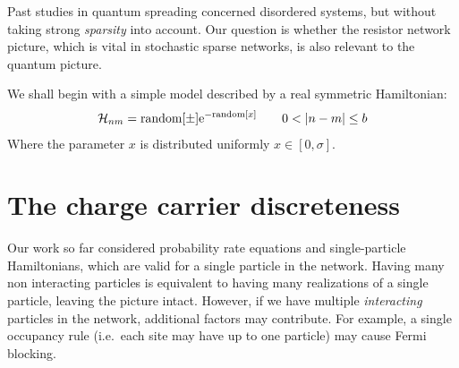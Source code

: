 Past studies in quantum spreading
\cite{cohen_wave_2000,izrailev_evolution_1997,venegas-andraca_quantum_2012,guarneri_spectral_1989,*guarneri_estimate_1993} concerned disordered systems, but
without taking strong \emph{sparsity} into account.
Our question is whether the resistor network picture,
which is vital in stochastic sparse networks, is also relevant to the quantum picture.


We shall begin with a simple model described by a real symmetric Hamiltonian:
%
\begin{align}
  \mathcal{H}_{nm} = \textrm{random}[\pm] \eexp{-\textrm{random}[x]} \qquad 0<|n-m|\le b
\end{align}
%
Where the parameter $x$ is distributed uniformly $x\in [0,\sigma]$. 


\section{The charge carrier discreteness}\label{sec:discreteness}

Our work so far considered probability rate equations and single-particle Hamiltonians, which are valid 
for a single particle in the network.
Having many non interacting particles is equivalent to having many 
realizations of a single particle, leaving the picture intact. 
However, if we have multiple \emph{interacting} particles in the network, 
additional factors may contribute. For example, a single occupancy rule 
(i.e.\ each site may have up to one particle) may cause Fermi blocking. 




